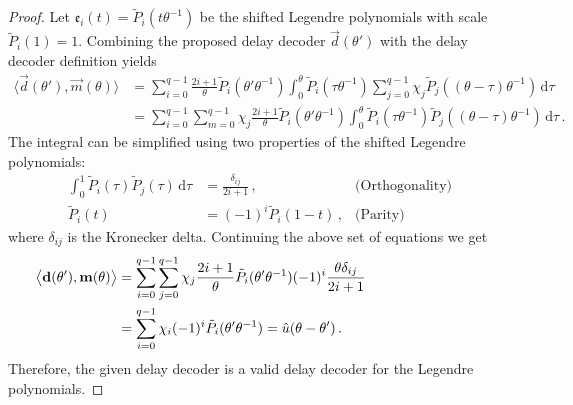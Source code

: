 \begin{proof}
	Let $\mathfrak{e}_i(t) = \tilde P_i(t \theta^{-1})$ be the shifted Legendre polynomials with scale $\tilde P_i(1) = 1$. Combining the proposed delay decoder $\vec d(\theta')$ with the delay decoder definition yields
	\begin{align*}
		\big\langle \vec d(\theta'), \vec m(\theta) \big\rangle
			&= \sum_{i = 0}^{q - 1} \frac{2i + 1}{\theta} \tilde P_i(\theta' \theta^{-1}) \int_{0}^\theta \tilde P_i(\tau \theta^{-1}) \sum_{j = 0}^{q - 1} \chi_j \tilde P_j((\theta - \tau )\theta^{-1})\,\mathrm{d}\tau \\
			&= \sum_{i = 0}^{q - 1} \sum_{m = 0}^{q - 1} \chi_j \frac{2i + 1}{\theta} \tilde P_i(\theta' \theta^{-1}) \int_{0}^\theta \tilde P_i(\tau \theta^{-1}) \tilde P_j((\theta - \tau )\theta^{-1})\,\mathrm{d}\tau \,.
	\end{align*}
	The integral can be simplified using two properties of the shifted Legendre polynomials:
	\begin{align*}
		\int_0^1 \tilde P_i(\tau) \tilde P_j(\tau) \, \mathrm{d}\tau &= \frac{\delta_{ij}}{2i + 1} \,, & \text{(Orthogonality)}  \\
		\tilde P_i(t) &= (-1)^i \tilde P_i(1 - t) \,, & \text{(Parity)}
	\end{align*}
	where $\delta_{ij}$ is the Kronecker delta. Continuing the above set of equations we get
	\begin{align*}
		\big\langle \vec d(\theta'), \vec m(\theta) \big\rangle
			&= \sum_{i = 0}^{q - 1} \sum_{j = 0}^{q - 1} \chi_j \frac{2i + 1}{\theta} \tilde P_i(\theta' \theta^{-1}) (-1)^i \frac{\theta \delta_{ij} }{2i + 1} \hspace{2.97cm}\\
			&= \sum_{i = 0}^{q - 1} \chi_i (-1)^i \tilde P_i(\theta' \theta^{-1})
			 = \hat u(\theta - \theta') \,.
	\end{align*}
	Therefore, the given delay decoder is a valid delay decoder for the Legendre polynomials.
\end{proof}
